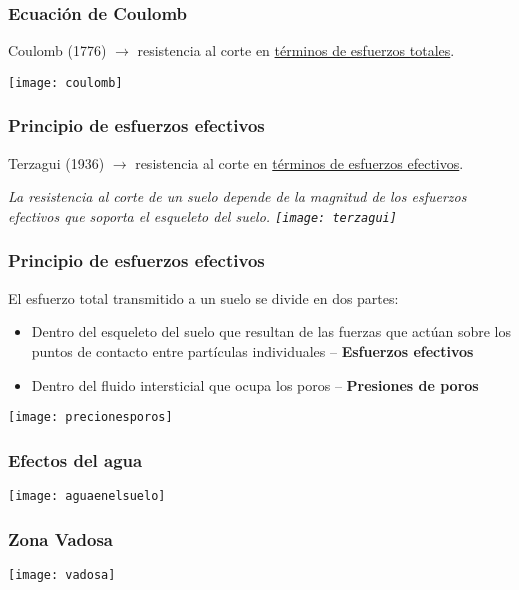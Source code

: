 \documentclass{beamer}
\begin{document}
\begin{frame}
\frametitle{Ecuación de Coulomb}
Coulomb (1776) $\rightarrow$ resistencia al corte en \uline{términos de esfuerzos totales}.
\begin{center}
   	\texttt{[image: coulomb]} 
\end{center}
\end{frame}
\begin{frame}
\frametitle{Principio de esfuerzos efectivos}
Terzagui (1936) $\rightarrow$ resistencia al corte en \uline{términos de esfuerzos efectivos}.
\begin{center}
\it{La resistencia al corte de un suelo depende de la magnitud de los esfuerzos efectivos que soporta el esqueleto del suelo.}
\vfill
   	\texttt{[image: terzagui]} 
\end{center}
\end{frame}
\begin{frame}
\frametitle{Principio de esfuerzos efectivos}
El esfuerzo total transmitido a un suelo se divide en dos partes:
\begin{itemize}
\item Dentro del esqueleto del suelo que resultan de las fuerzas que actúan sobre los puntos de contacto entre partículas individuales – \textbf{Esfuerzos efectivos}
\item Dentro del fluido intersticial que ocupa los poros – \textbf{Presiones de poros}
\end{itemize}
\vfill
\begin{center}
   	\texttt{[image: precionesporos]} 
\end{center}
\end{frame}
\begin{frame}
\frametitle{Efectos del agua}
\begin{center}
   	\texttt{[image: aguaenelsuelo]} 
\end{center}
\end{frame}
\begin{frame}
\frametitle{Zona Vadosa}
\begin{center}
   	\texttt{[image: vadosa]} 
\end{center}
\end{frame}
\end{document}

